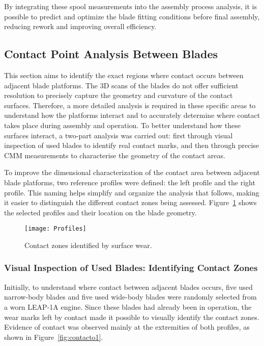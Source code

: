 By integrating these spool measurements into the assembly process analysis, it is possible to predict and optimize the blade fitting conditions before final assembly, reducing rework and improving overall efficiency.

\subsection{Contact Point Analysis Between Blades}
\label{cha:contacto}
This section aims to identify the exact regions where contact occurs between adjacent blade platforms. The 3D scans of the blades do not offer sufficient resolution to precisely capture the geometry and curvature of the contact surfaces. Therefore, a more detailed analysis is required in these specific areas to understand how the platforms interact and to accurately determine where contact takes place during assembly and operation.
To better understand how these surfaces interact, a two-part analysis was carried out: first through visual inspection of used blades to identify real contact marks, and then through precise CMM measurements to characterise the geometry of the contact areas.

To improve the dimensional characterization of the contact area between adjacent blade platforms, two reference profiles were defined: the left profile and the right profile. This naming helps simplify and organize the analysis that follows, making it easier to distinguish the different contact zones being assessed. Figure~\ref{fig:profiles} shows the selected profiles and their location on the blade geometry.

\begin{figure}[H]
    \centering
    \texttt{[image: Profiles]}
    \caption{Contact zones identified by surface wear.}
    \label{fig:profiles}
\end{figure}


\subsubsection{Visual Inspection of Used Blades: Identifying Contact Zones}
\label{cha:iv}

Initially, to understand where contact between adjacent blades occurs, five used narrow-body blades and five used wide-body blades were randomly selected from a worn LEAP-1A engine. Since these blades had already been in operation, the wear marks left by contact made it possible to visually identify the contact zones. Evidence of contact was observed mainly at the extremities of both profiles, as shown in Figure~\ref{fig:contacto1}.

